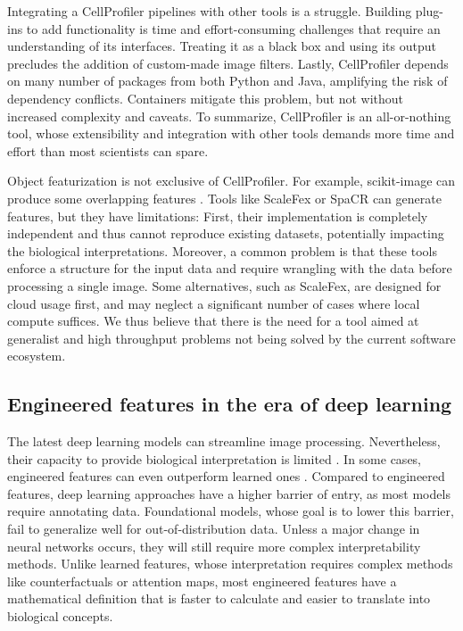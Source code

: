 \documentclass{article}
\begin{document}
Integrating a CellProfiler pipelines with other tools is a struggle. Building plug-ins to add functionality is time and effort-consuming challenges that require an understanding of its interfaces. Treating it as a black box and using its output precludes the addition of custom-made image filters. Lastly, CellProfiler depends on many number of packages from both Python and Java, amplifying the risk of dependency conflicts. Containers mitigate this problem, but not without increased complexity and caveats. To summarize, CellProfiler is an all-or-nothing tool, whose extensibility and integration with other tools demands more time and effort than most scientists can spare.

Object featurization is not exclusive of CellProfiler. For example, scikit-image can produce some overlapping features \citep{waltScikitimageImageProcessing2014}. Tools like ScaleFex or SpaCR \citep{comoletHighlyEfficientScalable2024,einarolafssonSpaCr2025} can generate features, but they have limitations: First, their implementation is completely independent and thus cannot reproduce existing datasets, potentially impacting the biological interpretations. Moreover, a common problem is that these tools enforce a structure for the input data and require wrangling with the data before processing a single image. Some alternatives, such as ScaleFex, are designed for cloud usage first, and may neglect a significant number of cases where local compute suffices. We thus believe that there is the need for a tool aimed at generalist and high throughput problems not being solved by the current software ecosystem.
\subsection{Engineered features in the era of deep learning}
\label{sec:org9dc3dfa}
The latest deep learning models can streamline image processing. Nevertheless, their capacity to provide biological interpretation is limited \citep{moenDeepLearningCellular2019}. In some cases, engineered features can even outperform learned ones \citep{tangMorphologicalProfilingDrug2024}. Compared to engineered features, deep learning approaches have a higher barrier of entry, as most models require annotating data. Foundational models, whose goal is to lower this barrier, fail to generalize well for out-of-distribution data. Unless a major change in neural networks occurs, they will still require more complex interpretability methods. Unlike learned features, whose interpretation requires complex methods like counterfactuals or attention maps, most engineered features have a mathematical definition that is faster to calculate and easier to translate into biological concepts.
\end{document}

